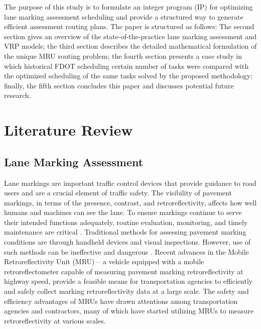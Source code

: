 \documentclass[numbered]{trbunofficial}
\begin{document}
The purpose of this study is to formulate an integer program (IP) for optimizing lane marking assessment scheduling and provide a structured way to generate efficient assessment routing plans.  The paper is structured as follows: The second section gives an overview of the state-of-the-practice lane marking assessment and VRP models; the third section describes the detailed mathematical formulation of the unique MRU routing problem; the fourth section presents a case study in which historical FDOT scheduling certain number of tasks were compared with the optimized scheduling of the same tasks solved by the proposed methodology; finally, the fifth section concludes this paper and discusses potential future research.


\section{Literature Review}
\subsection{Lane Marking Assessment}
Lane markings are important traffic control devices that provide guidance to road users and are a crucial element of traffic safety. The visibility of pavement markings, in terms of the presence, contrast, and retroreflectivity, affects how well humans and machines can see the lane.  To ensure markings continue to serve their intended functions adequately, routine evaluation, monitoring, and timely maintenance are critical \cite{Choubane2018}. Traditional methods for assessing pavement marking conditions are through handheld devices and visual inspections. However, use of such methods can be ineffective and dangerous \cite{Holzschuher2010}. Recent advances in the Mobile Retroreflectivity Unit (MRU) -- a vehicle equipped with a mobile retroreflectometer capable of measuring pavement marking retroreflectivity at highway speed, provide a feasible means for transportation agencies to efficiently and safely collect marking retroreflectivity data at a large scale. The safety and efficiency advantages of MRUs have drawn attentions among transportation agencies and contractors, many of which have started utilizing MRUs to measure retroreflectivity at various scales. 
\end{document}
